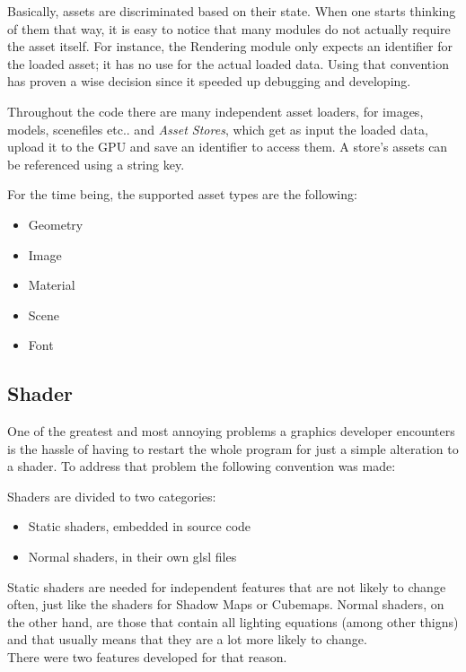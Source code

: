 Basically, assets are discriminated based on their state. When one starts thinking of them that
way, it is easy to notice that many modules do not actually require the asset itself. For
instance, the Rendering module only expects an identifier for the loaded asset; it has no use
for the actual loaded data. Using that convention has proven a wise decision since it speeded
up debugging and developing.

Throughout the code there are many independent asset loaders, for images, models, scenefiles etc..
and \textit{Asset Stores}, which get as input the loaded data, upload it to the GPU and save an
identifier to access them. A store's assets can be referenced using a string key.

\noindent For the time being, the supported asset types are the following:

\begin{itemize}
\item Geometry
\item Image
\item Material
\item Scene
\item Font
\end{itemize}

\subsection{Shader}
One of the greatest and most annoying problems a graphics developer encounters is the hassle of
having to restart the whole program for just a simple alteration to a shader. To address that
problem the following convention was made:

\noindent Shaders are divided to two categories:

\begin{itemize}
\item Static shaders, embedded in source code
\item Normal shaders, in their own glsl files
\end{itemize}

\noindent Static shaders are needed for independent features that are not likely to change often,
just like the shaders for Shadow Maps or Cubemaps. Normal shaders, on the other hand, are those
that contain all lighting equations (among other thigns) and that usually means that they are a
lot more likely to change.\\
There were two features developed for that reason.

